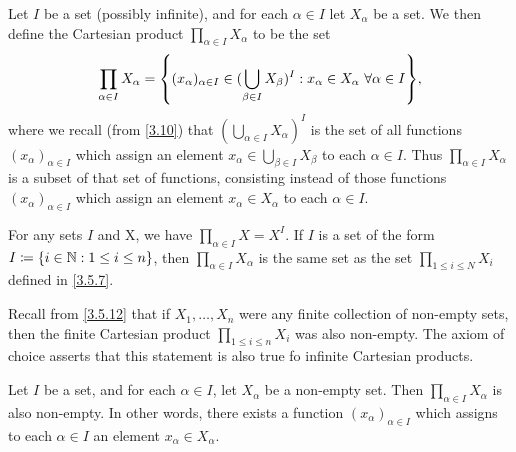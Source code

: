 \begin{defn}\label{8.4.1}
  Let \(I\) be a set (possibly infinite), and for each \(\alpha \in I\) let \(X_{\alpha}\) be a set.
  We then define the Cartesian product \(\prod_{\alpha \in I} X_{\alpha}\) to be the set
  \[
    \prod_{\alpha \in I} X_{\alpha} = \set{(x_{\alpha})_{\alpha \in I} \in (\bigcup_{\beta \in I} X_{\beta})^I : x_{\alpha} \in X_{\alpha} \ \forall \alpha \in I},
  \]
  where we recall (from \cref{3.10}) that \((\bigcup_{\alpha \in I} X_{\alpha})^I\) is the set of all functions \((x_{\alpha})_{\alpha \in I}\) which assign an element \(x_{\alpha} \in \bigcup_{\beta \in I} X_{\beta}\) to each \(\alpha \in I\).
  Thus \(\prod_{\alpha \in I} X_{\alpha}\) is a subset of that set of functions, consisting instead of those functions \((x_{\alpha})_{\alpha \in I}\) which assign an element \(x_{\alpha} \in X_{\alpha}\) to each \(\alpha \in I\).
\end{defn}

\begin{eg}\label{8.4.2}
  For any sets \(I\) and X, we have \(\prod_{\alpha \in I} X = X^I\).
  If \(I\) is a set of the form \(I \coloneqq \left\lbrace i \in \mathbb{N} : 1 \leq i \leq n\right\rbrace\), then \(\prod_{\alpha \in I} X_{\alpha}\) is the same set as the set \(\prod_{1 \leq i \leq N} X_i\) defined in \cref{3.5.7}.
\end{eg}

\begin{note}
  Recall from \cref{3.5.12} that if \(X_1, \dots, X_n\) were any finite collection of non-empty sets, then the finite Cartesian product \(\prod_{1 \leq i \leq n} X_i\) was also non-empty.
  The axiom of choice asserts that this statement is also true fo infinite Cartesian products.
\end{note}

\begin{ax}[Choice]\label{8.1}
  Let \(I\) be a set, and for each \(\alpha \in I\), let \(X_{\alpha}\) be a non-empty set.
  Then \(\prod_{\alpha \in I} X_{\alpha}\) is also non-empty.
  In other words, there exists a function \((x_{\alpha})_{\alpha \in I}\) which assigns to each \(\alpha \in I\) an element \(x_{\alpha} \in X_{\alpha}\).
\end{ax}

